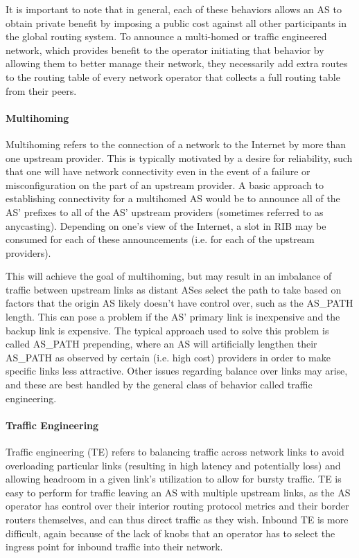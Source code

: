 It is important to note that in general, each of these behaviors allows an AS
to obtain private benefit by imposing a public cost against all other
participants in the global routing system. To announce a multi-homed or traffic
engineered network, which provides benefit to the operator initiating that
behavior by allowing them to better manage their network, they necessarily add
extra routes to the routing table of every network operator that collects a
full routing table from their peers.

\paragraph{Multihoming}

Multihoming refers to the connection of a network to the Internet by more than
one upstream provider. This is typically motivated by a desire for reliability,
such that one will have network connectivity even in the event of a failure or
misconfiguration on the part of an upstream provider. A basic approach to
establishing connectivity for a multihomed AS would be to announce all of the
AS' prefixes to all of the AS' upstream providers (sometimes referred to as
anycasting). Depending on one's view of the Internet, a slot in RIB may be
consumed for each of these announcements (i.e. for each of the upstream
providers).

This will achieve the goal of multihoming, but may result in an imbalance of
traffic between upstream links as distant ASes select the path to take based on
factors that the origin AS likely doesn't have control over, such as the
AS\_PATH length. This can pose a problem if the AS' primary link is inexpensive
and the backup link is expensive. The typical approach used to solve this
problem is called AS\_PATH prepending, where an AS will artificially lengthen
their AS\_PATH as observed by certain (i.e. high cost) providers in order to
make specific links less attractive. Other issues regarding balance over links
may arise, and these are best handled by the general class of behavior called
traffic engineering.

\paragraph{Traffic Engineering}

Traffic engineering (TE) refers to balancing traffic across network links to
avoid overloading particular links (resulting in high latency and potentially
loss) and allowing headroom in a given link's utilization to allow for bursty
traffic. TE is easy to perform for traffic leaving an AS with multiple upstream
links, as the AS operator has control over their interior routing protocol
metrics and their border routers themselves, and can thus direct traffic as
they wish. Inbound TE is more difficult, again because of the lack of knobs
that an operator has to select the ingress point for inbound traffic into their
network.

